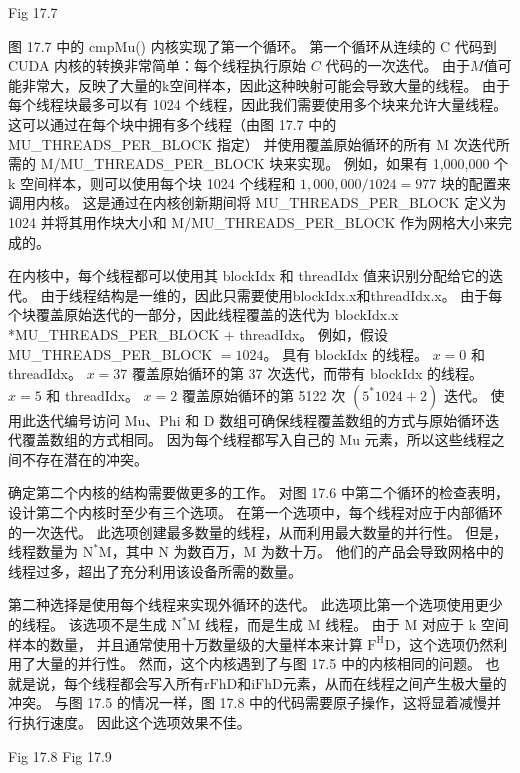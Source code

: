 {\color{red} Fig 17.7}

图 17.7 中的 cmpMu() 内核实现了第一个循环。 
第一个循环从连续的 $\mathrm{C}$ 代码到 CUDA 内核的转换非常简单：每个线程执行原始 $C$ 代码的一次迭代。 
由于$M$值可能非常大，反映了大量的k空间样本，因此这种映射可能会导致大量的线程。 
由于每个线程块最多可以有 1024 个线程，因此我们需要使用多个块来允许大量线程。 
这可以通过在每个块中拥有多个线程（由图 17.7 中的 MU\_THREADS\_PER\_BLOCK 指定）
并使用覆盖原始循环的所有 M 次迭代所需的 M/MU\_THREADS\_PER\_BLOCK 块来实现。
例如，如果有 1,000,000 个 k 空间样本，则可以使用每个块 1024 个线程和 $1,000,000 / 1024=977$ 块的配置来调用内核。 
这是通过在内核创新期间将 MU\_THREADS\_PER\_BLOCK 定义为 1024 
并将其用作块大小和 M/MU\_THREADS\_PER\_BLOCK 作为网格大小来完成的。

在内核中，每个线程都可以使用其 blockIdx 和 threadIdx 值来识别分配给它的迭代。 
由于线程结构是一维的，因此只需要使用blockIdx.x和threadIdx.x。 
由于每个块覆盖原始迭代的一部分，因此线程覆盖的迭代为 blockIdx.x *MU\_THREADS\_PER\_BLOCK + threadIdx。 
例如，假设 MU\_THREADS\_PER\_BLOCK $=1024$。 具有 blockIdx 的线程。 $x=0$ 和 threadIdx。 
$x=37$ 覆盖原始循环的第 37 次迭代，而带有 blockIdx 的线程。 $x=5$ 和 threadIdx。 
$x=2$ 覆盖原始循环的第 5122 次 $\left(5^{*} 1024+2\right)$ 迭代。 
使用此迭代编号访问 $\mathrm{Mu}$、Phi 和 D 数组可确保线程覆盖数组的方式与原始循环迭代覆盖数组的方式相同。 
因为每个线程都写入自己的 $\mathrm{Mu}$ 元素，所以这些线程之间不存在潜在的冲突。

确定第二个内核的结构需要做更多的工作。 对图 17.6 中第二个循环的检查表明，设计第二个内核时至少有三个选项。 
在第一个选项中，每个线程对应于内部循环的一次迭代。 此选项创建最多数量的线程，从而利用最大数量的并行性。 
但是，线程数量为 $\mathrm{N}^{*} \mathrm{M}$，其中 $\mathrm{N}$ 为数百万，$\mathrm{M}$ 为数十万。 
他们的产品会导致网格中的线程过多，超出了充分利用该设备所需的数量。

第二种选择是使用每个线程来实现外循环的迭代。 此选项比第一个选项使用更少的线程。 
该选项不是生成 $\mathrm{N}^{*} \mathrm{M}$ 线程，而是生成 $\mathrm{M}$ 线程。 
由于 $\mathrm{M}$ 对应于 k 空间样本的数量，
并且通常使用十万数量级的大量样本来计算 $\mathrm{F}^{\mathrm{H} } \mathrm{D}$，这个选项仍然利用了大量的并行性。 
然而，这个内核遇到了与图 17.5 中的内核相同的问题。 
也就是说，每个线程都会写入所有$\mathrm{rFhD}$和$\mathrm{iFhD}$元素，从而在线程之间产生极大量的冲突。 
与图 17.5 的情况一样，图 17.8 中的代码需要原子操作，这将显着减慢并行执行速度。 因此这个选项效果不佳。

{\color{red} Fig 17.8}
{\color{red} Fig 17.9}

